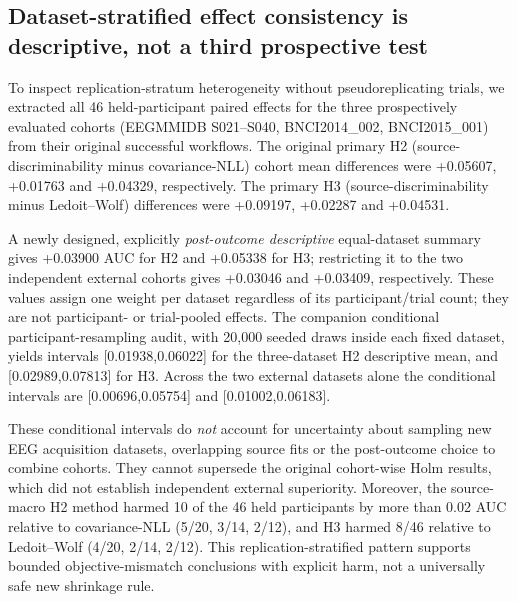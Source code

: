 \subsection{Dataset-stratified effect consistency is descriptive, not a third prospective test}
To inspect replication-stratum heterogeneity without pseudoreplicating
trials, we extracted all 46 held-participant paired effects for the three
prospectively evaluated cohorts (EEGMMIDB S021--S040, BNCI2014\_002,
BNCI2015\_001) from their original successful workflows. The original
primary H2 (source-discriminability minus covariance-NLL) cohort mean
differences were +0.05607, +0.01763 and +0.04329, respectively.
The primary H3 (source-discriminability minus Ledoit--Wolf) differences
were +0.09197, +0.02287 and +0.04531.

A newly designed, explicitly \emph{post-outcome descriptive}
equal-dataset summary gives +0.03900 AUC for H2 and +0.05338 for H3;
restricting it to the two independent external cohorts gives +0.03046
and +0.03409, respectively. These values assign one weight per dataset
regardless of its participant/trial count; they are not participant- or
trial-pooled effects. The companion conditional participant-resampling
audit, with 20,000 seeded draws inside each fixed dataset, yields
intervals [0.01938,0.06022] for the three-dataset H2 descriptive mean,
and [0.02989,0.07813] for H3. Across the two external datasets alone
the conditional intervals are [0.00696,0.05754] and
[0.01002,0.06183].

These conditional intervals do \emph{not} account for uncertainty about
sampling new EEG acquisition datasets, overlapping source fits or the
post-outcome choice to combine cohorts. They cannot supersede the
original cohort-wise Holm results, which did not establish independent
external superiority. Moreover, the source-macro H2 method harmed
10 of the 46 held participants by more than 0.02 AUC relative to
covariance-NLL (5/20, 3/14, 2/12), and H3 harmed 8/46 relative to
Ledoit--Wolf (4/20, 2/14, 2/12). This replication-stratified pattern
supports bounded objective-mismatch conclusions with explicit harm,
not a universally safe new shrinkage rule.
